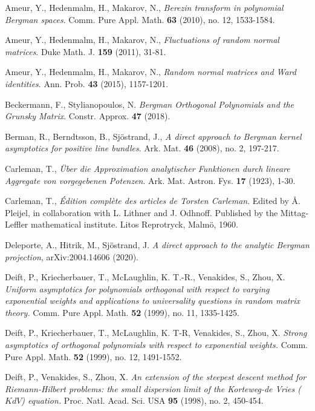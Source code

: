 \documentclass{amsart}
\theoremstyle{definition}
\theoremstyle{remark}
\numberwithin{equation}{subsection}
\begin{document}
\begin{thebibliography}{99}

 Ameur, Y., Hedenmalm, H., Makarov, N., \emph{Berezin 
transform in polynomial Bergman spaces}. Comm. Pure Appl. Math. 
\textbf{63} (2010), no. 12, 1533-1584.

 Ameur, Y., Hedenmalm, H., Makarov, N., \emph{Fluctuations
of random normal matrices}. Duke Math. J. \textbf{159} (2011), 31-81.

 Ameur, Y., Hedenmalm, H., Makarov, N., \emph{Random
normal matrices and Ward identities}. Ann. Prob. {\bf 43} (2015), 1157-1201.

 Beckermann, F., Stylianopoulos, N. 
\emph{Bergman Orthogonal Polynomials and the Grunsky
Matrix}. Constr. Approx. \textbf{47} (2018).

Berman, R., Berndtsson, B., Sj\"ostrand, J.,
\emph{A direct approach to Bergman kernel asymptotics for positive line 
bundles}. Ark. Mat. \textbf{46} (2008), no. 2, 197-217. 

Carleman, T., \emph{\"Uber die Approximation analytischer
Funktionen durch lineare Aggregate von vorgegebenen Potenzen}. 
Ark. Mat. Astron. Fys. \textbf{17} (1923), 1-30. 

 Carleman, T., \emph{\'Edition compl\`ete des articles de 
Torsten Carleman}. Edited by \AA{}. Pleijel, in collaboration with L.
Lithner and J. Odhnoff.  Published by the Mittag-Leffler mathematical 
institute. Litos Repro\-tryck, Malm\"o, 1960.

 Deleporte, A., Hitrik, M., Sj{\"o}strand, J. 
\emph{A direct approach to the analytic Bergman
projection}, arXiv:2004.14606 (2020).

 Deift, P., Kriecherbauer, T., McLaughlin, 
K. T.-R., Venakides, S., Zhou, X. 
\emph{Uniform asymptotics for polynomials orthogonal 
with respect to varying exponential weights and applications 
to universality questions in random matrix theory.} 
Comm. Pure Appl. Math. \textbf{52} (1999), no. 11, 1335-1425.

 Deift, P., Kriecherbauer, T., 
McLaughlin, K. T-R, Venakides, S., Zhou, X. 
\emph{Strong asymptotics of orthogonal polynomials with 
respect to exponential weights.} 
Comm. Pure Appl. Math. \textbf{52} (1999), no. 12, 1491-1552.

Deift, P., Venakides, S., Zhou, X. \emph{An extension of the steepest 
descent method for Riemann-Hilbert problems: the small dispersion 
limit of the Korteweg-de Vries ($KdV$) equation.}
 Proc. Natl. Acad. Sci. USA \textbf{95} (1998), no. 2, 450-454.


\end{thebibliography}
\end{document}
